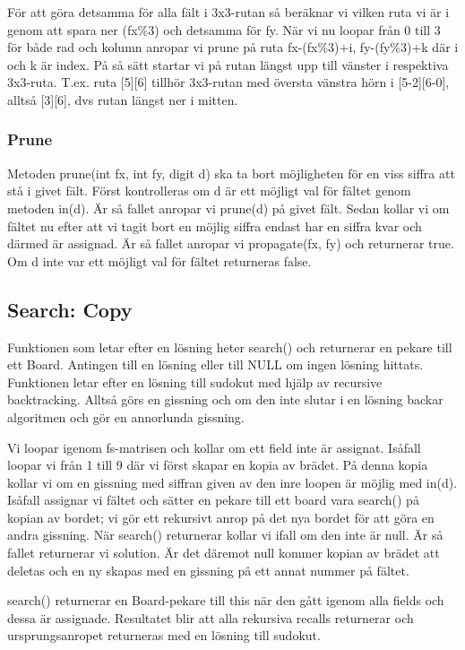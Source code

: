 \documentclass[a4paper, 11pt]{article}
\begin{document}
För att göra detsamma för alla fält i 3x3-rutan så beräknar vi vilken ruta vi är i genom att spara ner (fx\%3) och detsamma för fy. När vi nu loopar från 0 till 3 för både rad och kolumn anropar vi prune på ruta fx-(fx\%3)+i, fy-(fy\%3)+k där i och k är index. På så sätt startar vi på rutan längst upp till vänster i respektiva 3x3-ruta. T.ex. ruta [5][6] tillhör 3x3-rutan med översta vänstra hörn i [5-2][6-0], alltså [3][6], dvs rutan längst ner i mitten. 

\subsubsection{Prune}

Metoden prune(int fx, int fy, digit d) ska ta bort möjligheten för en viss siffra att stå i givet fält. Först kontrolleras om d är ett möjligt val för fältet genom metoden in(d). Är så fallet anropar vi prune(d) på givet fält. Sedan kollar vi om fältet nu efter att vi tagit bort en möjlig siffra endast har en siffra kvar och därmed är assignad. Är så fallet anropar vi propagate(fx, fy) och returnerar true. Om d inte var ett möjligt val för fältet returneras false.

\subsection{Search: Copy}

Funktionen som letar efter en lösning heter search() och returnerar en pekare till ett Board. Antingen till en lösning eller till NULL om ingen lösning hittats. Funktionen letar efter en lösning till sudokut med hjälp av recursive backtracking. Alltså görs en gissning och om den inte slutar i en lösning backar algoritmen och gör en annorlunda gissning.

Vi loopar igenom fs-matrisen och kollar om ett field inte är assignat. Isåfall loopar vi från 1 till 9 där vi först skapar en kopia av brädet. På denna kopia kollar vi om en gissning med siffran given av den inre loopen är möjlig med in(d). Isåfall assignar vi fältet och sätter en pekare till ett board vara search() på kopian av bordet; vi gör ett rekursivt anrop på det nya bordet för att göra en andra gissning. När search() returnerar kollar vi ifall om den inte är null. Är så fallet returnerar vi solution. Är det däremot null kommer kopian av brädet att deletas och en ny skapas med en gissning på ett annat nummer på fältet. 

search() returnerar en Board-pekare till this när den gått igenom alla fields och dessa är assignade. Resultatet blir att alla rekursiva recalls returnerar och ursprungsanropet returneras med en lösning till sudokut.
\end{document}
